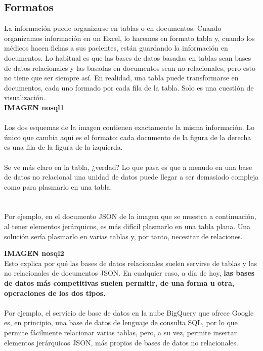 \documentclass[twoside,twocolumn]{article}
\begin{document}
\begin{flushright}
\begin{itemize}
\subsection{Formatos}
La información puede organizarse en tablas o en documentos. Cuando organizamos información en un Excel, lo hacemos en formato tabla y, cuando los médicos hacen fichas a sus pacientes, están guardando la información en documentos. Lo habitual es que las bases de datos basadas en tablas sean bases de datos relacionales y las basadas en documentos sean no relacionales, pero esto no tiene que ser siempre así. En realidad, una tabla puede transformarse en documentos, cada uno formado por cada fila de la tabla. Solo es una cuestión de visualización.
\textbf{}\\
\textbf{ IMAGEN nosql1}\\
\textbf{}\\
Los dos esquemas de la imagen contienen exactamente la misma información. Lo único que cambia aquí es el formato: cada documento de la figura de la derecha es una fila de la figura de la izquierda.
\textbf{}\\
\textbf{}\\
Se ve más claro en la tabla, ¿verdad? Lo que pasa es que a menudo en una base de datos no relacional una unidad de datos puede llegar a ser demasiado compleja como para plasmarlo en una tabla. \textbf{}\\
\textbf{}\\
\textbf{}\\
Por ejemplo, en el documento JSON de la imagen que se muestra a continuación, al tener elementos jerárquicos, es más difícil plasmarlo en una tabla plana. Una solución sería plasmarlo en varias tablas y, por tanto, necesitar de relaciones.


\textbf{ IMAGEN nosql2}\\

Esto explica por qué las bases de datos relacionales suelen servirse de tablas y las no relacionales de documentos JSON. En cualquier caso, a día de hoy, \textbf{las bases de datos más competitivas suelen permitir, de una forma u otra, operaciones de los dos tipos.}\\ 
\textbf{}\\
 Por ejemplo, el servicio de base de datos en la nube BigQuery que ofrece Google es, en principio, una base de datos de lenguaje de consulta SQL, por lo que permite fácilmente relacionar varias tablas, pero, a su vez, permite insertar elementos jerárquicos JSON, más propios de bases de datos no relacionales.


\end{itemize}
\end{flushright}
\end{document}
